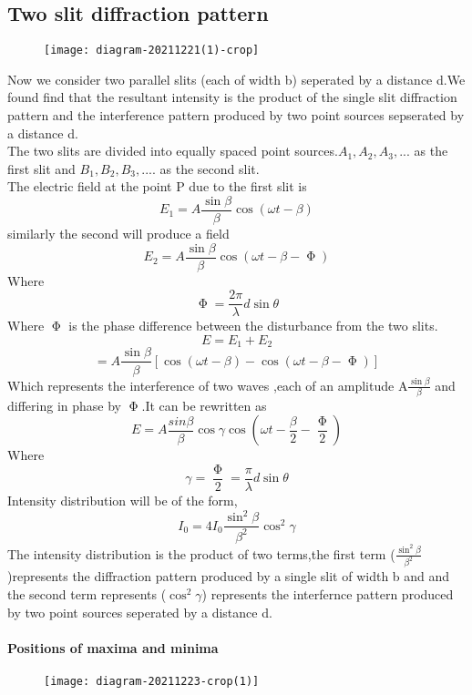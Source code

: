 \subsection{Two slit diffraction pattern}
\begin{figure}[H]
	\centering
	\texttt{[image: diagram-20211221(1)-crop]}
	\caption{}
	\label{}
\end{figure}
Now we consider two parallel slits (each of width b) seperated by a distance d.We found find that the resultant intensity is the product of the single slit diffraction pattern and the interference pattern produced by two point sources sepserated by a distance d.\\
The two slits are divided into equally spaced point sources.$A_1,A_2,A_3,...$ as the first slit and $B_1,B_2,B_3,....$ as the second slit.\\
The electric field at the point P due to the first slit is \\
$$E_1=A \frac{\sin \beta}{\beta} \cos (\omega t-\beta)$$
similarly the second will produce a field\\
$$E_2=A \frac{\sin \beta}{\beta} \cos (\omega t-\beta-\upPhi)$$
Where $$\upPhi=\frac{2\pi}{\lambda}d \sin \theta$$
Where $\upPhi$ is the phase difference between the disturbance from the two slits.\\
$$E=E_1+E_2$$
$$=A \frac{\sin \beta}{\beta}\left[ \cos(\omega t-\beta)-\cos(\omega t-\beta -\upPhi)\right] $$
Which represents the interference of two waves ,each of an amplitude A$\frac{\sin \beta}{\beta}$ and differing in phase by $\upPhi$.It can be rewritten as \\
$$E=A \frac{sin\beta}{\beta} \cos\gamma \cos\left( \omega t-\frac{\beta}{2}-\frac{\upPhi}{2}\right) $$
Where $$\gamma=\frac{\upPhi}{2}=\frac{\pi}{\lambda}d\sin\theta$$
Intensity distribution will be of the form,
$$I_0=4I_0\frac{\sin^2\beta}{\beta^2}\cos^2\gamma$$
The intensity distribution is the product of two terms,the first term ($\frac{\sin^2\beta}{\beta^2}$)represents the diffraction pattern produced by a single slit of width b and and the second term represents ($\cos^2\gamma$) represents the interfernce pattern produced by two point sources seperated by a distance d.\\
\paragraph{Positions of maxima and minima}
\begin{figure}[H]
	\centering
	\texttt{[image: diagram-20211223-crop(1)]}
	\caption{}
	\label{}
\end{figure}
